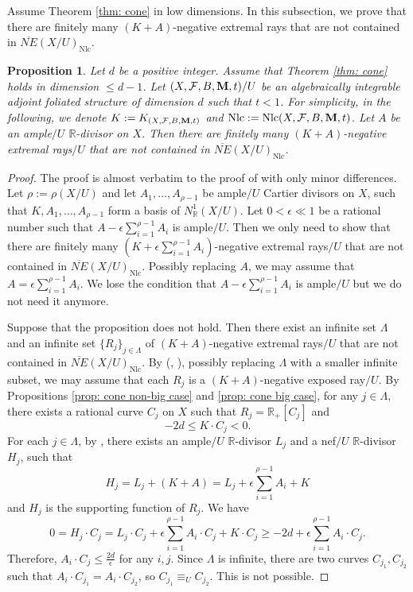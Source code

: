 \documentclass[12pt]{amsart}
\numberwithin{equation}{section}
\newcommand{\Mm}{{\bf{M}}}
\newcommand{\Rr}{\mathbb{R}}
\newcommand{\Nlc}{\operatorname{Nlc}}
\newcommand{\Ff}{\mathcal{F}}
\newtheorem{prop}[thm]{Proposition}
\theoremstyle{definition}
\theoremstyle{definition}
\theoremstyle{definition}
\begin{document}
Assume Theorem \ref{thm: cone} in low dimensions. In this subsection, we prove that there are finitely many $(K+A)$-negative extremal rays that are not contained in $\overline{NE}(X/U)_{\Nlc}$.

\begin{prop}\label{prop: cone finiteness rays}
Let $d$ be a positive integer. Assume that Theorem \ref{thm: cone} holds in dimension $\leq d-1$. Let $(X,\Ff,B,\Mm,t)/U$ be an algebraically integrable adjoint foliated structure of dimension $d$ such that $t<1$. For simplicity, in the following, we denote $K:=K_{(X,\Ff,B,\Mm,t)}$ and $\Nlc:=\Nlc(X,\Ff,B,\Mm,t)$. Let $A$ be an ample$/U$ $\Rr$-divisor on $X$. Then there are finitely many $(K+A)$-negative 
extremal rays$/U$ that are not contained in $\overline{NE}(X/U)_{\Nlc}$.
\end{prop}
\begin{proof}
The proof is almost verbatim to the proof of \cite[Proposition 8.4.3]{CHLX23} with only minor differences. Let $\rho:=\rho(X/U)$ and let $A_1,\dots,A_{\rho-1}$ be ample$/U$ Cartier divisors on $X$, such that $K,A_1,\dots,A_{\rho-1}$ form a basis of $N^1_{\mathbb R}(X/U)$. Let $0<\epsilon\ll 1$ be a rational number such that $A-\epsilon\sum_{i=1}^{\rho-1}A_i$ is ample$/U$. Then we only need to show that there are finitely many $(K+\epsilon\sum_{i=1}^{\rho-1}A_i)$-negative extremal rays$/U$ that are not contained in $\overline{NE}(X/U)_{\Nlc}$. Possibly replacing $A$, we may assume that $A=\epsilon\sum_{i=1}^{\rho-1}A_i$. We lose the condition that  $A-\epsilon\sum_{i=1}^{\rho-1}A_i$ is ample$/U$ but we do not need it anymore.

Suppose that the proposition does not hold. Then there exist an infinite set $\Lambda$ and an infinite set $\{R_j\}_{j\in\Lambda}$ of $(K+A)$-negative extremal rays$/U$ that are not contained in $\overline{NE}(X/U)_{\Nlc}$. By \cite[Definition-Lemma 3.1.8]{CHLX23} (\cite[Corollary 18.7.1]{Roc97}, \cite[Lemma 6.2]{Spi20}), possibly replacing $\Lambda$ with a smaller infinite subset, we may assume that each $R_j$ is a  $(K+A)$-negative exposed ray$/U$. By Propositions \ref{prop: cone non-big case} and \ref{prop: cone big case}, for any $j\in\Lambda$, there exists a rational curve $C_j$ on $X$  such that $R_j=\mathbb R_+[C_j]$ and 
$$-2d\leq K\cdot C_j<0.$$ 
For each $j\in\Lambda$, by \cite[Lemma 8.4.1]{CHLX23}, there exists an ample$/U$ $\Rr$-divisor $L_j$ and a nef$/U$ $\Rr$-divisor $H_j$, such that
$$H_j=L_j+(K+A)=L_j+\epsilon\sum_{i=1}^{\rho-1}A_i+K$$
and $H_j$ is the supporting function of $R_j$. We have
$$0=H_j\cdot C_j=L_j\cdot C_j+\epsilon\sum_{i=1}^{\rho-1}A_i\cdot C_j+K\cdot C_j\geq-2d+\epsilon\sum_{i=1}^{\rho-1}A_i\cdot C_j.$$
Therefore, $A_i\cdot C_j\leq\frac{2d}{\epsilon}$ for any $i,j$. Since $\Lambda$ is infinite, there are two curves $C_{j_1},C_{j_2}$ such that $A_i\cdot C_{j_1}=A_i\cdot C_{j_2}$, so $C_{j_1}\equiv_U C_{j_2}$. This is not possible.
\end{proof}
\end{document}
